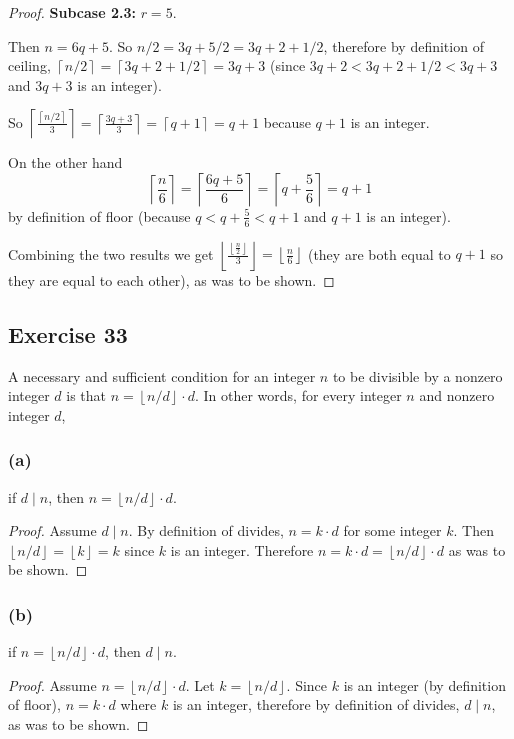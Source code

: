 \documentclass[14pt]{extarticle}
\newcommand{\floor}[1]{{\left\lfloor#1\right\rfloor}}
\newcommand{\ceil}[1]{{\left\lceil#1\right\rceil}}
\begin{document}
\begin{proof}
        {\bf Subcase 2.3:} $r = 5$.

    Then $n = 6q+5$. So $n/2 = 3q+5/2 = 3q+2+1/2$, therefore by definition of ceiling, $\ceil{n/2} = \ceil{3q+2+1/2} = 3q+3$ (since $3q+2 < 3q+2+1/2< 3q+3$ and $3q+3$ is an integer).

    So $\ceil{\frac{\ceil{n/2}}{3}} = \ceil{\frac{3q+3}{3}} = \ceil{q+1} = q+1$ because $q+1$ is an integer.

    On the other hand
    \[
        \ceil{\frac{n}{6}} = \ceil{\frac{6q+5}{6}} = \ceil{q+\frac{5}{6}} = q+1
    \]
    by definition of floor (because $q < q+\frac{5}{6} < q+1$ and $q+1$ is an integer).

    Combining the two results we get $ \floor{\frac{\floor{\frac{n}{2}}}{3}} = \floor{\frac{n}{6}}$ (they are both equal to $q+1$ so they are equal to each other), as was to be shown.
\end{proof}

\subsection{Exercise 33}
A necessary and sufficient condition for an integer $n$ to be divisible by a nonzero integer $d$ is that $n = \floor{n/d} \cdot d$. In other words, for every integer $n$ and nonzero integer $d$,

\subsubsection{(a)}
if $d \mid n$, then $n = \floor{n/d} \cdot d$.

\begin{proof}
    Assume $d \mid n$. By definition of divides, $n = k \cdot d$ for some integer $k$. Then $\floor{n/d} = \floor{k} = k$ since $k$ is an integer. Therefore $n = k \cdot d = \floor{n/d} \cdot d$ as was to be shown.
\end{proof}

\subsubsection{(b)}
if $n = \floor{n/d} \cdot d$, then $d \mid n$.

\begin{proof}
    Assume $n = \floor{n/d} \cdot d$. Let $k = \floor{n/d}$. Since $k$ is an integer (by definition of floor), $n = k \cdot d$ where $k$ is an integer, therefore by definition of divides, $d \mid n$, as was to be shown.
\end{proof}
\end{document}
